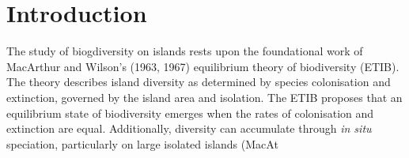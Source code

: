 \documentclass{article}
\begin{document}
\clearpage

\section*{Introduction}

The study of biogdiversity on islands rests upon the foundational work of MacArthur and Wilson's (1963, 1967) equilibrium theory of biodiversity (ETIB). The theory describes island diversity as determined by species colonisation and extinction, governed by the island area and isolation. The ETIB proposes that an equilibrium state of biodiversity emerges when the rates of colonisation and extinction are equal. Additionally, diversity can accumulate through \textit{in situ} speciation, particularly on large isolated islands (MacAt
\end{document}
